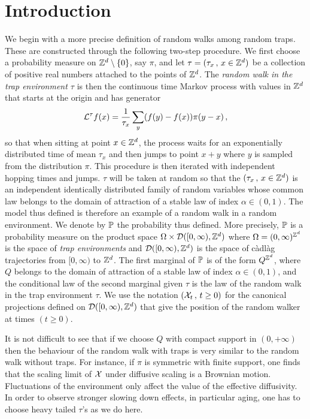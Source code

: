 \section{Introduction} 
\setcounter{equation}{0} 


We begin with a more precise definition of random walks among random traps. These are constructed 
through the following two-step procedure. 
We first choose a probability measure on $\Z^d\setminus\{0\}$, say $\pi$, and let $\tau=(\tau_x\,,\, x\in\Z^d)$ be a collection of 
positive real numbers attached to the points of $\Z^d$. 
The {\it random walk in the trap environment $\tau$} 
is then the continuous time Markov process with values in $\Z^d$ that starts at the origin and 
 has generator 
\begin{equation}\label{eq:df0}
 {\cal L}^\tau f(x)=\frac 1{\tau_x}\sum_y (f(y)-f(x))\pi(y-x)\,,
\end{equation} 
so that 
when sitting at point $x\in\Z^d$, 
the process waits for an exponentially distributed time of mean $\tau_x$ and then jumps to point $x+y$ where $y$ 
is sampled from the distribution $\pi$. This procedure is then iterated with independent hopping times and jumps. 
$\tau$ will be taken at random so that the $(\tau_x\,,\, x\in\Z^d)$ is an independent identically distributed 
family of random variables whose common law belongs to the domain of attraction of a 
stable law of index $\alpha\in(0,1)$. The model thus defined is therefore an example of a random walk in a random 
environment. 
We denote by $\P$ the probability thus defined. More precisely, $\P$ is a probability measure on the product space 
$\Omega\times{\cal D}([0,\infty),\Z^d)$ where $\Omega=(0,\infty)^{\Z^d}$ is the space of {\it trap environments} 
and ${\cal D}([0,\infty),\Z^d)$ is the space of c\`adl\`ag trajectories from $[0,\infty)$ to $\Z^d$. The first marginal of 
$\P$ is of the form $Q^{\Z^d}$, where $Q$ belongs to the domain of attraction of a 
stable law of index $\alpha\in(0,1)$, and the conditional law of the second marginal given $\tau$ is the law of 
the random walk in the trap environment $\tau$. We use the notation $(\X_t\,,\, t\geq 0)$ for the canonical 
projections defined on ${\cal D}([0,\infty),\Z^d)$ that give the position of the random walker 
at times $(t\geq 0)$. 




\begin {rmk} 
It is not difficult to see that if we choose $Q$ with compact support in $(0,+\infty)$ then the behaviour of the random
walk with traps is very similar to the random walk without traps. For instance, if $\pi$ is symmetric with finite support, one 
finds that the scaling limit of $\X$ under diffusive scaling is a Brownian motion. Fluctuations of the environment 
only affect the value of the effective diffusivity. In order to observe stronger slowing down effects, in particular aging, one has to 
choose heavy tailed $\tau$'s as we do here. 
\end{rmk}

